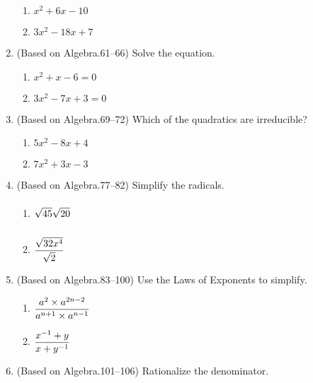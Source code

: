 \documentclass[11pt]{article}
\newcommand{\ds}{\displaystyle}
\begin{document}
\begin{enumerate}
  \begin{multicols}{2}
  \begin{enumerate}
  \item $\ds x^2+6x-10$
  \item $\ds 3x^2-18x+7$
  \end{enumerate}
  \end{multicols}
\item (Based on Algebra.61--66) Solve the equation. %
  \begin{multicols}{2}
  \begin{enumerate}
  \item $\ds x^2+x-6=0$
  \item $\ds 3x^2-7x+3=0$
  \end{enumerate}
  \end{multicols}
\item (Based on Algebra.69--72) Which of the quadratics are irreducible? %
  \begin{multicols}{2}
  \begin{enumerate}
  \item $\ds 5x^2-8x+4$
  \item $\ds 7x^2+3x-3$
  \end{enumerate}
  \end{multicols}
\item (Based on Algebra.77--82) Simplify the radicals. %
  \begin{multicols}{2}
  \begin{enumerate}
  \item $\ds\vphantom{\frac{\sqrt{x}}{\sqrt{x}}}\sqrt{45}\sqrt{20}$
  \item $\ds\vphantom{\frac{\sqrt{x}}{\sqrt{x}}}\frac{\sqrt{32x^4}}{\sqrt{2}}$
  \end{enumerate}
  \end{multicols}
\item (Based on Algebra.83--100) Use the Laws of Exponents to simplify. %
  \begin{multicols}{2}
  \begin{enumerate}
  \item $\ds\vphantom{\frac{a^n}{a^n}} \frac{a^2\times a^{2n-2}}{a^{n+1}\times a^{n-1}}$
  \item $\ds\vphantom{\frac{a^n}{a^n}} \frac{x^{-1}+y}{x+y^{-1}}$
  \end{enumerate}
  \end{multicols}
\item (Based on Algebra.101--106) Rationalize the denominator. %
  \begin{multicols}{2}

\end{multicols}
\end{enumerate}
\end{document}
